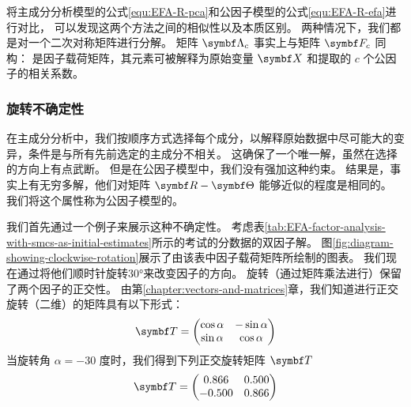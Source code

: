 将主成分分析模型的公式\eqref{equ:EFA-R-pca}和公因子模型的公式\eqref{equ:EFA-R-efa}进行对比，
可以发现这两个方法之间的相似性以及本质区别。
两种情况下，我们都是对一个二次对称矩阵进行分解。
矩阵 $ \vLambda_c $ 事实上与矩阵 $ \vF_c $ 同构：
是因子载荷矩阵，其元素可被解释为原始变量 $ \vX $ 和提取的 $ c $ 个公因子的相关系数。

\subsubsection{旋转不确定性}

在主成分分析中，我们按顺序方式选择每个成分，以解释原始数据中尽可能大的变异，条件是与所有先前选定的主成分不相关。
这确保了一个唯一解，虽然在选择的方向上有点武断。
但是在公因子模型中，我们没有强加这种约束。
结果是，事实上有无穷多解，他们对矩阵 $ \vR - \vTheta $ 能够近似的程度是相同的。
我们将这个属性称为公因子模型的。

我们首先通过一个例子来展示这种不确定性。
考虑表\ref{tab:EFA-factor-analysis-with-smcs-as-initial-estimates}所示的考试的分数据的双因子解。
图\ref{fig:diagram-showing-clockwise-rotation}展示了由该表中因子载荷矩阵所绘制的图表。
我们现在通过将他们顺时针旋转30°来改变因子的方向。
旋转（通过矩阵乘法进行）保留了两个因子的正交性。
由第\ref{chapter:vectors-and-matrices}章，我们知道进行正交旋转（二维）的矩阵具有以下形式：
\begin{equation}
    \vT = \begin{pmatrix}
        \cos\alpha & -\sin\alpha \\ 
        \sin\alpha & \cos\alpha
    \end{pmatrix}
\end{equation}
当旋转角 $ \alpha = -30 $ 度时，我们得到下列正交旋转矩阵 $ \vT $
\begin{equation}
    \vT = \begin{pmatrix}
        0.866 & 0.500 \\
        -0.500 & 0.866
    \end{pmatrix}
\end{equation}

